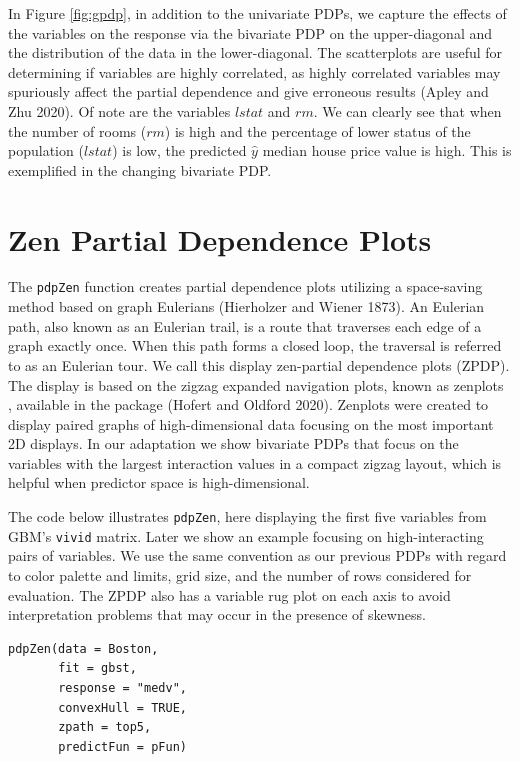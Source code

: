 In Figure \ref{fig:gpdp}, in addition to the univariate PDPs, we capture the effects of the variables on the response via the bivariate PDP on the upper-diagonal and the distribution of the data in the lower-diagonal. The scatterplots are useful for determining if variables are highly correlated, as highly correlated variables may spuriously affect the partial dependence and give erroneous results (Apley and Zhu 2020). Of note are the variables \(lstat\) and \(rm\). We can clearly see that when the number of rooms (\(rm\)) is high and the percentage of lower status of the population (\(lstat\)) is low, the predicted \(\hat{y}\) median house price value is high. This is exemplified in the changing bivariate PDP.

\hypertarget{sec:ZPDP}{%
\section{Zen Partial Dependence Plots}\label{sec:ZPDP}}

The \texttt{pdpZen} function creates partial dependence plots utilizing a space-saving method based on graph Eulerians (Hierholzer and Wiener 1873). An Eulerian path, also known as an Eulerian trail, is a route that traverses each edge of a graph exactly once. When this path forms a closed loop, the traversal is referred to as an Eulerian tour. We call this display zen-partial dependence plots (ZPDP). The display is based on the zigzag expanded navigation plots, known as zenplots , available in the  package (Hofert and Oldford 2020). Zenplots were created to display paired graphs of high-dimensional data focusing on the most important 2D displays.
In our adaptation we show bivariate PDPs that focus on the variables with the largest interaction values in a compact zigzag layout, which is helpful when predictor space is high-dimensional.

The code below illustrates \texttt{pdpZen}, here displaying the first five variables from GBM's \texttt{vivid} matrix. Later we show an example focusing on high-interacting pairs of variables.
We use the same convention as our previous PDPs with regard to color palette and limits, grid size, and the number of rows considered for evaluation. The ZPDP also has a variable rug plot on each axis to avoid interpretation problems that may occur in the presence of skewness.

\begin{verbatim}
pdpZen(data = Boston,
       fit = gbst,
       response = "medv",
       convexHull = TRUE,
       zpath = top5,
       predictFun = pFun)
\end{verbatim}

